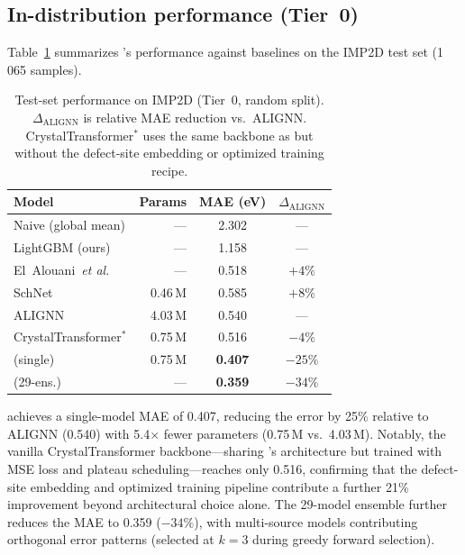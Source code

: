 
\subsection{In-distribution performance (Tier~0)}\label{sec:id}

Table~\ref{tab:main} summarizes \dart{}'s performance against baselines on
the IMP2D test set (1\,065 samples).

\begin{table}[t]
\centering
\caption{Test-set performance on IMP2D (Tier~0, random split).
  $\Delta_\mathrm{ALIGNN}$ is relative MAE reduction vs.\ ALIGNN.
  CrystalTransformer$^*$ uses the same backbone as \dart{} but without
  the defect-site embedding or optimized training recipe.}
\label{tab:main}
\begin{tabular}{@{}lrcc@{}}
\toprule
Model & Params & MAE (eV) & $\Delta_\mathrm{ALIGNN}$ \\
\midrule
Naive (global mean)  & ---     & 2.302 & --- \\
LightGBM (ours)      & ---     & 1.158 & --- \\
El~Alouani~\textit{et al.} & --- & 0.518 & $+4\%$ \\
SchNet               & 0.46\,M & 0.585 & $+8\%$ \\
ALIGNN               & 4.03\,M & 0.540 & --- \\
CrystalTransformer$^*$  & 0.75\,M & 0.516 & $-4\%$ \\
\midrule
\dart{} (single)     & 0.75\,M & \textbf{0.407} & $-25\%$ \\
\dart{} (29-ens.)    & ---     & \textbf{0.359} & $-34\%$ \\
\bottomrule
\end{tabular}
\end{table}

\dart{} achieves a single-model MAE of 0.407\eV{}, reducing the error by
25\% relative to ALIGNN (0.540\eV{}) with 5.4$\times$ fewer parameters
(0.75\,M vs.\ 4.03\,M).
Notably, the vanilla CrystalTransformer backbone---sharing \dart{}'s
architecture but trained with MSE loss and plateau scheduling---reaches
only 0.516\eV{}, confirming that the defect-site embedding and optimized
training pipeline contribute a further 21\% improvement beyond
architectural choice alone.
The 29-model ensemble further reduces the MAE to 0.359\eV{} ($-34\%$),
with multi-source models contributing orthogonal error patterns
(selected at $k=3$ during greedy forward selection).

